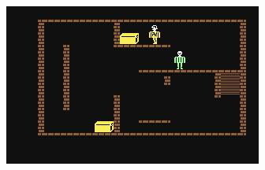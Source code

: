  \begin{figure}[H]
\centering
      \includegraphics[width=\textwidth]{imgs/CastleWolfensteinC64.png}
\end{figure}
